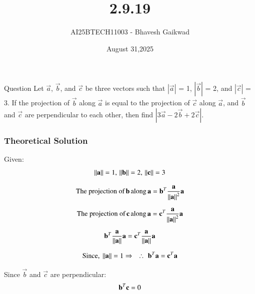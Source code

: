\documentclass{beamer}
\title
{2.9.19}
\date{August 31,2025}
\author 
{AI25BTECH11003 - Bhavesh Gaikwad}
\begin{document}
\frame{\titlepage}
\begin{frame}{Question}
 Let $\overrightarrow{a}$,
$\overrightarrow{b}$, and $\overrightarrow{c}$ be three vectors such that $|\overrightarrow{a}|$ = 1, $|\overrightarrow{b}|$ = 2, and $|\overrightarrow{c}|$ = 3. If the
projection of $\overrightarrow{b}$ along $\overrightarrow{a}$ is equal to the projection of $\overrightarrow{c}$ along $\overrightarrow{a}$, and $\overrightarrow{b}$ and $\overrightarrow{c}$ are perpendicular to each other, then find $|3\overrightarrow{a} - 2\overrightarrow{b} + 2\overrightarrow{c}|$.
\end{frame}


\begin{frame}[fragile]
    \frametitle{Theoretical Solution}
Given: 
\begin{equation}
\norm{\vec{a}} = 1, \, \norm{\vec{b}} = 2, \, \norm{\vec{c}} = 3\\
\end{equation}

\begin{equation}
\text{The projection of} \, \vec{b} \, \text{along} \, \vec{a} = \vec{b}^T\dfrac{\vec{a}}{\norm{\vec{a}}^2}\vec{a}    
\end{equation}

\begin{equation}
\text{The projection of} \, \vec{c} \, \text{along} \, \vec{a} = \vec{c}^T\dfrac{\vec{a}}{\norm{\vec{a}}^2}\vec{a}    
\end{equation}


\begin{equation}
\vec{b}^T\dfrac{\vec{a}}{\norm{\vec{a}}}\vec{a} = \vec{c}^T\dfrac{\vec{a}}{\norm{\vec{a}}}\vec{a}\\
\end{equation}

\begin{equation}
\text{Since, } \norm{\vec{a}} = 1
\Rightarrow \quad
\therefore \, \, \vec{b}^T\vec{a} = \vec{c}^T\vec{a}
\end{equation}

Since $\vec{b}$ and $\vec{c}$ are perpendicular: 
\begin{equation}
\vec{b}^T\vec{c} = 0\\
\end{equation}

\end{frame}
\end{document}
